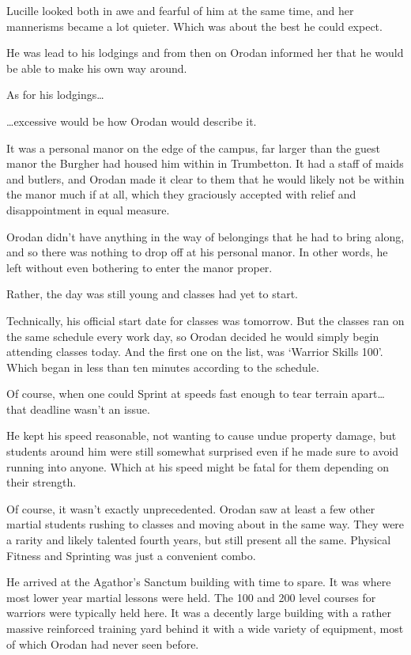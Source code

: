\documentclass[a4paper,10pt]{book}
\begin{document}
Lucille looked both in awe and fearful of him at the same time, and her mannerisms became a lot quieter. Which was about the best he could expect.\par
He was lead to his lodgings and from then on Orodan informed her that he would be able to make his own way around.\par
As for his lodgings…\par
…excessive would be how Orodan would describe it.\par
It was a personal manor on the edge of the campus, far larger than the guest manor the Burgher had housed him within in Trumbetton. It had a staff of maids and butlers, and Orodan made it clear to them that he would likely not be within the manor much if at all, which they graciously accepted with relief and disappointment in equal measure.\par
Orodan didn’t have anything in the way of belongings that he had to bring along, and so there was nothing to drop off at his personal manor. In other words, he left without even bothering to enter the manor proper.\par
Rather, the day was still young and classes had yet to start.\par
Technically, his official start date for classes was tomorrow. But the classes ran on the same schedule every work day, so Orodan decided he would simply begin attending classes today. And the first one on the list, was ‘Warrior Skills 100’. Which began in less than ten minutes according to the schedule.\par
Of course, when one could Sprint at speeds fast enough to tear terrain apart… that deadline wasn’t an issue.\par
He kept his speed reasonable, not wanting to cause undue property damage, but students around him were still somewhat surprised even if he made sure to avoid running into anyone. Which at his speed might be fatal for them depending on their strength.\par
Of course, it wasn’t exactly unprecedented. Orodan saw at least a few other martial students rushing to classes and moving about in the same way. They were a rarity and likely talented fourth years, but still present all the same. Physical Fitness and Sprinting was just a convenient combo.\par
He arrived at the Agathor’s Sanctum building with time to spare. It was where most lower year martial lessons were held. The 100 and 200 level courses for warriors were typically held here. It was a decently large building with a rather massive reinforced training yard behind it with a wide variety of equipment, most of which Orodan had never seen before.\par
\end{document}
